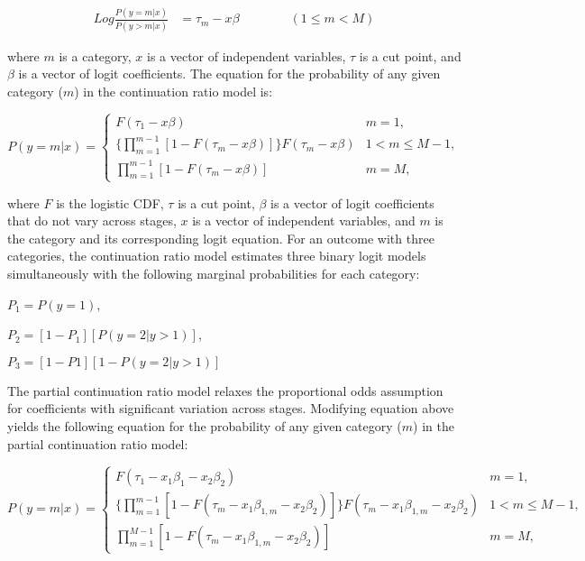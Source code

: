 \begin{align*}
Log \frac{P(y=m|x)}{P(y>m|x)} &= \tau_{m} - x\beta \qquad\qquad (1 \leq m < M)
\end{align*}

where $m$ is a category, $x$ is a vector of independent variables, $\tau$ is a cut point, and $\beta$ is a vector of logit coefficients. The equation for the probability of any given category ($m$) in the continuation ratio model is:

\begin{equation*}
P(y = m | x) =
\begin{cases}
F(\tau_{1} - x\beta) & m=1,\\
\{ \prod_{m=1}^{m-1} [1-F(\tau_{m} - x\beta)] \} F(\tau_{m} - x\beta) & 1 < m \leq M - 1, \\
\prod_{m=1}^{m-1} [1-F(\tau_{m} - x\beta)] & m=M,
\end{cases}
\end{equation*}

where $F$ is the logistic CDF, $\tau$ is a cut point, $\beta$ is a vector of logit coefficients that do not vary across stages, $x$ is a vector of independent variables, and $m$ is the category and its corresponding logit equation. For an outcome with three categories, the continuation ratio model estimates three binary logit models simultaneously with the following marginal probabilities for each category:

$P_{1} = P(y=1)$,

$P_{2} = [1-P_{1}][P(y=2 | y>1)]$,

$P_{3} = [1-P{1}][1-P(y=2|y>1)]$

The partial continuation ratio model relaxes the proportional odds assumption for coefficients with significant variation across stages. Modifying equation above yields the following equation for the probability of any given category ($m$) in the partial continuation ratio model:


\begin{equation*}
P(y = m | x) =
\begin{cases}
F(\tau_{1} - x_{1}\beta_{1} - x_{2}\beta_{2}) & m=1,\\
\{ \prod_{m=1}^{m-1} [1-F(\tau_{m} - x_{1}\beta_{1,m} - x_{2}\beta_{2})] \} F(\tau_{m} - x_{1}\beta_{1,m} - x_{2}\beta_{2}) & 1 < m \leq M - 1, \\
\prod_{m=1}^{M-1} [1-F(\tau_{m} - x_{1}\beta_{1,m} - x_{2}\beta_{2})] & m=M,
\end{cases}
\end{equation*}

